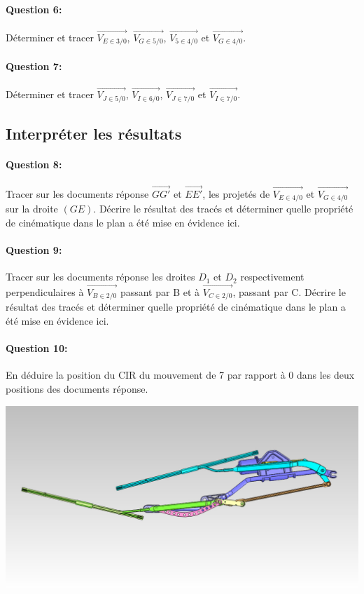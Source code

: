 \reponse[1]

\paragraph{Question 6:} Déterminer et tracer $\overrightarrow{V_{E\in 3/0}}$, $\overrightarrow{V_{G\in 5/0}}$, $\overrightarrow{V_{5\in 4/0}}$ et $\overrightarrow{V_{G\in 4/0}}$.

\reponse[1]

\paragraph{Question 7:} Déterminer et tracer $\overrightarrow{V_{J\in 5/0}}$, $\overrightarrow{V_{I\in 6/0}}$, $\overrightarrow{V_{J\in 7/0}}$ et $\overrightarrow{V_{I\in 7/0}}$.

\reponse[1]

\subsection{Interpréter les résultats}
	
\paragraph{Question 8:} Tracer sur les documents réponse $\overrightarrow{GG'}$ et $\overrightarrow{EE'}$, les projetés de $\overrightarrow{V_{E\in 4/0}}$ et $\overrightarrow{V_{G\in 4/0}}$ sur la droite $(GE)$. Décrire le résultat des tracés et déterminer quelle propriété de cinématique dans le plan a été mise en évidence ici.
	
\paragraph{Question 9:} Tracer sur les documents réponse les droites $D_1$ et $D_2$ respectivement perpendiculaires à $\overrightarrow{V_{B\in 2/0}}$ passant par B et à $\overrightarrow{V_{C\in 2/0}}$, passant par C. Décrire le résultat des tracés et déterminer quelle propriété de cinématique dans le plan a été mise en évidence ici.

\paragraph{Question 10:} En déduire la position du CIR du mouvement de 7 par rapport à 0 dans les deux positions des documents réponse.

\includegraphics[width=0.9\linewidth]{img/essuie_glace_bas}


